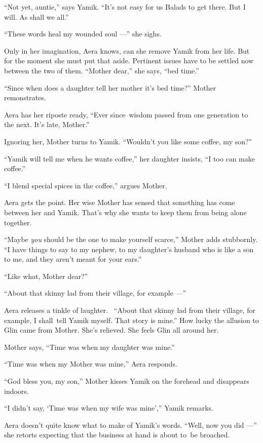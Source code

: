 \documentclass[twoside,11pt]{book}
\begin{document}
{}``Not yet, auntie,'' says Yamik. ``It's not easy for us Balads to get there. But I will. As shall we all.''

{}``These words heal my wounded soul ---'' she sighs.

Only in her imagination, Aera knows, can she remove Yamik from her life. But for the moment she must put that aside.
Pertinent issues have to be settled now between the two of them. ``Mother dear,'' she says, ``bed time.''

{}``Since when does a daughter tell her mother it's bed time?''  Mother remonstrates.

Aera has her riposte ready, ``Ever since~wisdom passed from one generation to the next. It's late, Mother.''

Ignoring her, Mother turns to Yamik. {}``Wouldn't you like some coffee, my son?''

``Yamik will tell me when he wants coffee,'' her daughter insists, ``I too can make
coffee.''

{}``I blend special spices in the coffee,'' argues Mother.

Aera gets the point. Her wise Mother has sensed that something has come between her and Yamik. That's why she wants to
keep them from being alone together.

{}``Maybe \textit{you} should be the one to make yourself scarce,'' Mother adds stubbornly. ``I have things to say to my
nephew, to my daughter's husband who is like a son to me, and they aren't meant for your ears.''

{}``Like what, Mother dear?''

{}``About that skinny{ }lad from their village, for example ---''

Aera releases a tinkle of laughter. ~``About that skinny lad from their village, for example, I shall~tell Yamik
myself. That story is mine.'' How lucky the allusion to Glin came from Mother. She's relieved. She feels Glin all
around her.

Mother says, ``Time was when my daughter was mine.''

 ``Time was when my Mother was mine,{}'' Aera responds.

``God bless you, my son,'' Mother kisses Yamik on the forehead and disappears indoors.

``I didn't say, `Time was when my wife was mine','' Yamik remarks.

Aera doesn't quite know what to make of Yamik's words.
``Well, now you did ---'' she retorts expecting that the business at hand is about to~be broached.
\end{document}
